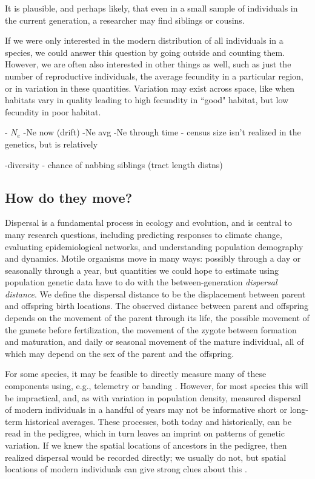 \documentclass{ar-1col}
\begin{document}
It is plausible, and perhaps likely,
that even in a small sample of individuals in the current generation,
a researcher may find siblings or cousins.

If we were only interested in
the modern distribution of all individuals in a species,
we could answer this question by going outside and counting them.
However, we are often also interested in other things as well,
such as just the number of reproductive individuals,
the average fecundity in a particular region,
or in variation in these quantities.
Variation may exist across space,
like when habitats vary in quality
leading to high fecundity in ``good" habitat,
but low fecundity in poor habitat.

      

        - $N_e$
            -Ne now (drift)
    -Ne avg
    -Ne through time
        - census size isn't realized in the genetics, but is relatively
  
    -diversity - chance of nabbing siblings (tract length distns)

\subsection{How do they move?}

Dispersal is a fundamental process in ecology and evolution,
and is central to many research questions,
including predicting responses to climate change,
evaluating epidemiological networks,
and understanding population demography and dynamics.
Motile organisms move in many ways:
possibly through a day or seasonally through a year,
but quantities we could hope to estimate using population genetic data
have to do with the between-generation \emph{dispersal distance}.
We define the dispersal distance to be the displacement
between parent and offspring birth locations.
The observed distance between parent and offspring
depends on the movement of the parent through its life,
the possible movement of the gamete before fertilization,
the movement of the zygote between formation and maturation,
and daily or seasonal movement of the mature individual,
all of which may depend on the sex of the parent and the offspring.


For some species,
it may be feasible to directly measure many of these components
using, e.g., telemetry or banding \citep{dispersal_estimation}.
However, for most species this will be impractical,
and, as with variation in population density,
measured dispersal of modern individuals in a handful of years
may not be informative short or long-term historical averages.
These processes,
both today and historically,
can be read in the pedigree,
which in turn leaves an imprint on patterns of genetic variation.
If we knew the spatial locations of ancestors in the pedigree,
then realized dispersal would be recorded directly;
we usually do not, but spatial locations of modern individuals
can give strong clues about this \citep{Cayuela2018}.
\end{document}
